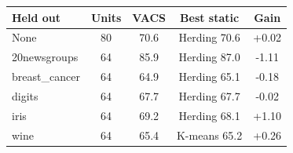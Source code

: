 \begin{tabular}{lcccc}
\toprule
Held out & Units & VACS & Best static & Gain \\
\midrule
None & 80 & 70.6 & Herding 70.6 & +0.02 \\
20newsgroups & 64 & 85.9 & Herding 87.0 & -1.11 \\
breast\_cancer & 64 & 64.9 & Herding 65.1 & -0.18 \\
digits & 64 & 67.7 & Herding 67.7 & -0.02 \\
iris & 64 & 69.2 & Herding 68.1 & +1.10 \\
wine & 64 & 65.4 & K-means 65.2 & +0.26 \\
\bottomrule
\end{tabular}
